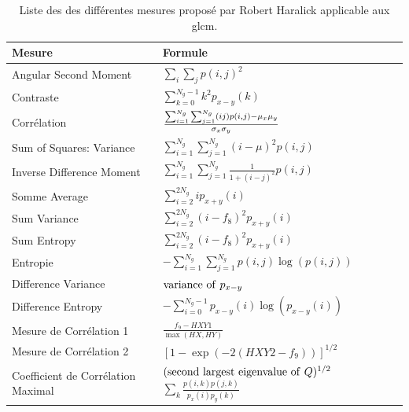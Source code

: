 \begin{table}[H]
    \centering
    \begin{tabular}{ll}
        \toprule
        \textbf{Mesure}             & \textbf{Formule}                                                                              \\ \hline
        Angular Second Moment       & $ \sum_i\sum_jp(i,j)^2$                                                                       \\
        Contraste                   & $\sum_{k=0}^{N_g-1} k^2 p_{x-y}(k)$                                                           \\
        Corrélation                 & $\frac{\Large{\sum_{i=1}^{N_g}\sum_{j=1}^{N_g}} (ij)p(i,j) - \mu_x\mu_y}{\sigma_x\sigma_y}$   \\
        Sum of Squares: Variance    & $\sum_{i=1}^{N_g}\sum_{j=1}^{N_g} (i - \mu)^2 p(i,j)$                                         \\
        Inverse Difference Moment   & $\sum_{i=1}^{N_g}\sum_{j=1}^{N_g} \frac{1}{1 + (i - j)^2} p(i,j)$                             \\     
        Somme Average                 & $\sum_{i=2}^{2N_g} i p_{x+y}(i)$                                                              \\    
        Sum Variance                & $\sum_{i=2}^{2N_g} (i - f_8)^2 p_{x+y}(i)$                                                    \\    
        Sum Entropy                 & $\sum_{i=2}^{2N_g} (i - f_8)^2 p_{x+y}(i)$                                                    \\    
        Entropie                     & $-\sum_{i=1}^{N_g}\sum_{j=1}^{N_g} p(i,j) \log(p(i,j))$                                       \\    
        Difference Variance         & ${\rm variance \ of ~} p_{x-y}$                                                               \\    
        Difference Entropy          & $-\sum_{i=0}^{N_g-1} p_{x-y}(i) \log(p_{x-y}(i))$                                             \\
        Mesure de Corrélation 1             & $\frac{f_9 - HXY1}{\max(HX,HY)}$                                                              \\  
        Mesure de Corrélation 2             & $[1 - \exp(-2(HXY2 - f_9))]^{1/2}$                                                            \\ 
        Coefficient de Corrélation Maximal  & $({\rm second \ largest \ eigenvalue \ of ~} Q)^{1/2}$ $\sum_k \frac{p(i,k)p(j,k)}{p_x(i)p_y(k)}$ \\ 
        \bottomrule
    \end{tabular}
    \caption{Liste des des différentes mesures proposé par Robert Haralick applicable aux \gls{glcm}.}
    \label{tab:haralick_descriptors}
\end{table}\par
 
